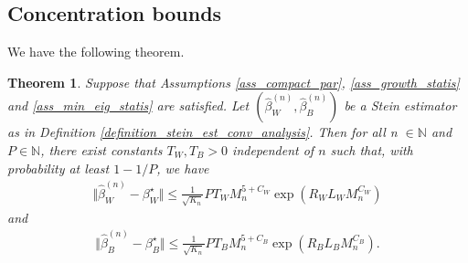 \documentclass{article}
\newtheorem{Theorem}{Theorem}[section]
\begin{document}
\subsection{Concentration bounds}  \label{section_standad_errors}
We have the following theorem.
\begin{Theorem} \label{theorem_standard_error}
    Suppose that Assumptions \ref{ass_compact_par}, \ref{ass_growth_statis} and \ref{ass_min_eig_statis} are satisfied. Let $( \hat{\beta}_W^{(n)},  \hat{\beta}_B^{(n)})$ be a Stein estimator as in Definition \ref{definition_stein_est_conv_analysis}. Then for all n $ \in  \mathbb{N}$ and $P \in \mathbb{N}$, there exist constants $T_W, T_B>0$ independent of $n$ such that, with probability at least $1-1/P$,  we have
    \begin{align*}
        \Vert \hat{\beta}_W^{(n)} - \beta_W^{\star} \Vert \leq \frac{1}{\sqrt{K_n}} {P T_W M_n^{5+C_W} \exp(R_W L_W M_n^{C_W} )} 
    \end{align*}
    and
    \begin{align*}
        \Vert \hat{\beta}_B^{(n)} - \beta_B^{\star} \Vert \leq \frac{1}{\sqrt{K_n}} {P T_B  M_n^{5+C_B}\exp(R_B L_B M_n^{C_B} )}.
    \end{align*}
\end{Theorem}
\end{document}

